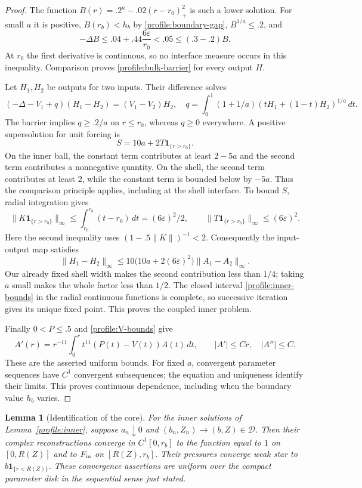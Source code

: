 \documentclass[11pt]{article}
\numberwithin{equation}{section}
\newtheorem{lemma}[theorem]{Lemma}
\theoremstyle{definition}
\theoremstyle{remark}
\begin{document}
\begin{proof}
The function
$B(r)=.2^a-.02(r-r_0)_+^2$ is such a lower solution.  For small $a$ it
is positive, $B(r_b)<h_b$ by \eqref{profile:boundary-gap},
$B^{1/a}\le.2$, and
\[
 -\Delta B\le .04+.44\frac{6\varepsilon}{r_0}<.05
       \le(.3-.2)B.
\]
At $r_0$ the first derivative is continuous, so no interface measure
occurs in this inequality.  Comparison proves
\eqref{profile:bulk-barrier} for every output $H$.

Let $H_1,H_2$ be outputs for two inputs.  Their difference solves
\[
 (-\Delta-V_1+q)(H_1-H_2)=(V_1-V_2)H_2,
 \quad
 q=\int_0^1(1+1/a)(tH_1+(1-t)H_2)^{1/a}\,dt.
\]
The barrier implies $q\ge.2/a$ on $r\le r_0$, whereas $q\ge0$
everywhere.  A positive supersolution for unit forcing is
\begin{equation}\label{profile:small-inverse}
 S=10a+2T\mathbf1_{\{r>r_0\}}.
\end{equation}
On the inner ball, the constant term contributes at least $2-5a$ and
the second term contributes a nonnegative quantity.  On the shell, the
second term contributes at least $2$, while the constant term is bounded
below by $-5a$.  Thus the comparison principle applies, including at
the shell interface.  To bound $S$, radial integration gives
\[
 \|K\mathbf1_{\{r>r_0\}}\|_\infty
 \le\int_{r_0}^{r_b}(t-r_0)\,dt=(6\varepsilon)^2/2,
 \qquad
 \|T\mathbf1_{\{r>r_0\}}\|_\infty\le(6\varepsilon)^2.
\]
Here the second inequality uses
$(1-.5\|K\|)^{-1}<2$.  Consequently the input-output map satisfies
\[
 \|H_1-H_2\|_\infty
 \le10\big(10a+2(6\varepsilon)^2\big)\|A_1-A_2\|_\infty.
\]
Our already fixed shell width makes the second contribution less than
$1/4$; taking $a$ small makes the whole factor less than $1/2$.
The closed interval \eqref{profile:inner-bounds} in the radial continuous
functions is complete, so successive iteration gives its unique fixed
point.  This proves the coupled inner problem.

Finally $0<P\le.5$ and \eqref{profile:V-bounds} give
\[
 A'(r)=r^{-11}\int_0^r t^{11}(P(t)-V(t))A(t)\,dt,
       \qquad |A'|\le Cr,\quad |A''|\le C.
\]
These are the asserted uniform bounds.  For fixed $a$, convergent
parameter sequences have $C^1$ convergent subsequences; the equation and
uniqueness identify their limits.  This proves continuous dependence,
including when the boundary value $h_b$ varies.
\end{proof}

\begin{lemma}[Identification of the core]\label{profile:core-limit}
For the inner solutions of Lemma~\ref{profile:inner}, suppose
$a_n\downarrow0$ and $(b_n,Z_n)\to(b,Z)\in\mathcal D$.  Then their
complex reconstructions converge in $C^1[0,r_b]$ to the function equal to
$1$ on $[0,R(Z)]$ and to $F_{\rm in}$ on $[R(Z),r_b]$.
Their pressures converge weak star to $b\mathbf1_{\{r<R(Z)\}}$.
These convergence assertions are uniform over the compact parameter disk
in the sequential sense just stated.
\end{lemma}
\end{document}
